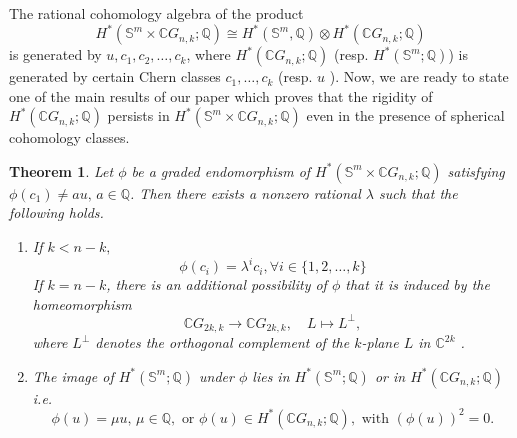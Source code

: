\documentclass{amsart}
\newtheorem{theorem}{Theorem}[section]
\begin{document}
	The rational cohomology algebra of the product
	\[
	H^*(\mathbb S^m \times \mathbb CG_{n,k};\mathbb Q)\cong H^*(\mathbb S^m,\mathbb Q)\otimes H^*(\mathbb CG_{n,k};\mathbb Q)
	\]
	is generated by $u,c_1,c_2,\dots,c_k$, where $H^*(\mathbb{C}G_{n,k};\mathbb{Q})$ (resp. $H^*(\mathbb S^m;\mathbb Q)$) is generated by certain Chern classes $c_1, \dots, c_k$ (resp. $u$%
). Now, we %
are ready to state one of the main results of our paper which proves that the rigidity of $H^*(\mathbb CG_{n,k};\mathbb Q)$ persists in $H^*(\mathbb S^m \times \mathbb CG_{n,k};\mathbb Q)$ even in the presence of spherical cohomology classes.
	\begin{theorem}
		Let $\phi$ be a graded endomorphism of 
		$H^*(\mathbb S^{m}\times\mathbb C G_{n,k};\mathbb Q)$ 
		satisfying $\phi(c_1)\neq a u, \, a\in\mathbb Q$.  
		Then there exists a nonzero rational $\lambda$ such that the following %
holds.
		\begin{enumerate}\label{result main}
			\item If $k < n - k,$ 
			$$ \phi(c_i) = \lambda^i c_i, \forall i \in \{1,2,\dots,k\}$$
			If %
$k = n - k$, there is an additional possibility of $\phi$ that it is induced by the homeomorphism 
			\[
			\mathbb{C}G_{2k,k} \longrightarrow \mathbb{C}G_{2k,k}, 
			\quad L \longmapsto L^{\perp},
			\]
			where $L^{\perp}$ denotes the orthogonal complement of the $k$-plane $L$ in $\mathbb{C}^{2k}$%
.
			
			\item 
			The image of $H^*(\mathbb{S}^m;\mathbb{Q})$ under $\phi$ lies in 
			$H^*(\mathbb{S}^m;\mathbb{Q})$ or in $H^*(\mathbb{C}G_{n,k};\mathbb{Q})$ i.e. $$\phi(u) = \mu u,\, \mu \in \mathbb{Q}, \text{ or } \phi(u) \in H^*(\mathbb{C}G_{n,k};\mathbb{Q}), \text{ with } (\phi(u))^2 =0.$$
			
		\end{enumerate}
	\end{theorem}
\end{document}
